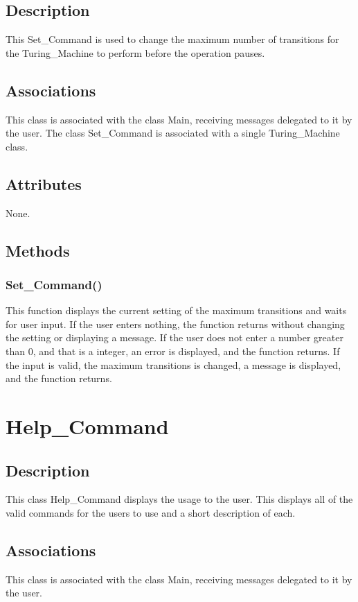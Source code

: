 \documentclass{report}
\begin{document}
	\subsection{Description}
    This Set\_Command is used to change the maximum number of transitions for the Turing\_Machine to perform before the operation pauses.
    \subsection{Associations} 
    This class is associated with the class Main, receiving messages delegated to it by the user.
      The class Set\_Command is associated with a single Turing\_Machine class.
    
    \subsection{Attributes}
    None.
    \subsection{Methods}
    \subsubsection{Set\_Command()}
    This function displays the current setting of the maximum transitions and waits for user input. If the user enters nothing, the function returns without changing the setting or displaying a message. If the user does not enter a number greater than 0, and that is a integer, an error is displayed, and the function returns. If the input is valid, the maximum transitions is changed, a message is displayed, and the function returns.
    
    
    
    

\section{Help\_Command}
	\subsection{Description}
    This class Help\_Command displays the usage to the user. This displays all of the valid commands for the users to use and a short description of each.
    \subsection{Associations}   
    This class is associated with the class Main, receiving messages delegated to it by the user.
\end{document}
